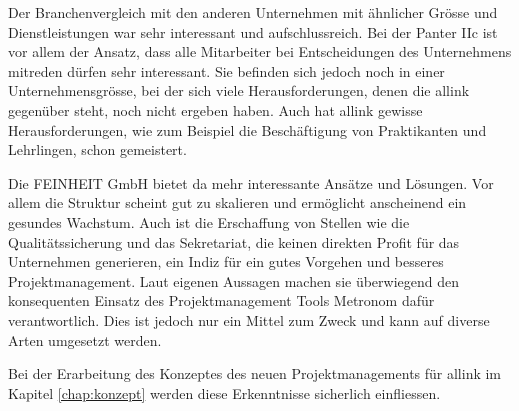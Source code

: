 Der Branchenvergleich mit den anderen Unternehmen mit ähnlicher Grösse und
Dienstleistungen war sehr interessant und aufschlussreich. Bei der Panter IIc
ist vor allem der Ansatz, dass alle Mitarbeiter bei Entscheidungen des 
Unternehmens mitreden dürfen sehr interessant. Sie befinden sich jedoch noch
in einer Unternehmensgrösse, bei der sich viele Herausforderungen, denen die allink 
gegenüber steht, noch nicht ergeben haben. Auch hat allink gewisse Herausforderungen,
wie zum Beispiel die Beschäftigung von Praktikanten und Lehrlingen, schon gemeistert.

Die FEINHEIT GmbH bietet da mehr interessante Ansätze und Lösungen. Vor allem
die Struktur scheint gut zu skalieren und ermöglicht anscheinend ein gesundes Wachstum.
Auch ist die Erschaffung von Stellen wie die Qualitätssicherung und das Sekretariat,
die keinen direkten Profit für das Unternehmen generieren, ein Indiz für ein
gutes Vorgehen und besseres Projektmanagement. Laut eigenen Aussagen machen sie
überwiegend den konsequenten Einsatz des Projektmanagement Tools Metronom dafür
verantwortlich. Dies ist jedoch nur ein Mittel zum Zweck und kann auf
diverse Arten umgesetzt werden.

Bei der Erarbeitung des Konzeptes des neuen Projektmanagements für allink 
im Kapitel \ref{chap:konzept} werden diese Erkenntnisse sicherlich einfliessen.

